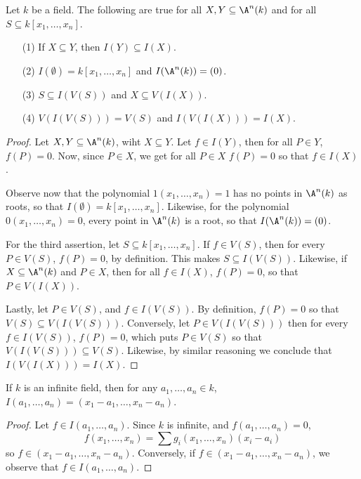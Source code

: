 \begin{lemma}\label{1.3.2}
    Let $k$ be a field. The following are true for all $X,Y \subseteq \A^n(k)$
    and for all $S \subseteq k[x_1, \dots, x_n]$.
    \begin{enumerate}
        \item[(1)] If $X \subseteq Y$, then $I(Y) \subseteq I(X)$.

        \item[(2)] $I(\emptyset)=k[x_1, \dots, x_n]$ and $I(\A^n(k))=(0)$.

        \item[(3)] $S \subseteq I(V(S))$ and $X \subseteq V(I(X))$.

        \item[(4)] $V(I(V(S)))=V(S)$ and $I(V(I(X)))=I(X)$.
    \end{enumerate}
\end{lemma}
\begin{proof}
    Let $X,Y \subseteq \A^n(k)$, wiht $X \subseteq Y$. Let $f \in I(Y)$, then
    for all $P \in Y$, $f(P)=0$. Now, since $P \in X$, we get for all $P \in X$
    $f(P)=0$ so that $f \in I(X)$.

    Observe now that the polynomial $1(x_1, \dots, x_n)=1$ has no points in
    $\A^n(k)$ as roots, so that $I(\emptyset)=k[x_1, \dots, x_n]$. Likewise, for
    the polynomial $0(x_1, \dots, x_n)=0$, every point in $\A^n(k)$ is a root,
    so that $I(\A^n(k))=(0)$.

    For the third assertion, let $S \subseteq k[x_1, \dots, x_n]$. If $f \in V(S)$,
    then for every  $P \in V(S)$, $f(P)=0$, by definition. This makes $S
    \subseteq I(V(S))$. Likewise, if $X \subseteq \A^n(k)$ and $P \in X$, then
    for all $f \in I(X)$, $f(P)=0$, so that $P \in V(I(X))$.

    Lastly, let $P \in V(S)$, and $f \in I(V(S))$. By definition, $f(P)=0$ so
    that $V(S) \subseteq V(I(V(S)))$. Conversely, let $P \in V(I(V(S)))$ then
    for every $f \in I(V(S))$, $f(P)=0$, which puts $P \in V(S)$ so that
    $V(I(V(S))) \subseteq V(S)$. Likewise, by similar reasoning we conclude that
    $I(V(I(X)))=I(X)$.
\end{proof}
\begin{corollary}
    If $k$ is an infinite field, then for any  $a_1, \dots, a_n \in k$, $I(a_1,
    \dots, a_n)=(x_1-a_1, \dots, x_n-a_n)$.
\end{corollary}
\begin{proof}
    Let $f \in I(a_1, \dots, a_n)$. Since $k$ is infinite, and  $f(a_1, \dots,
    a_n)=0$,
    \begin{equation*}
        f(x_1, \dots, x_n)=\sum{g_i(x_1, \dots, x_n)(x_i-a_i)}
    \end{equation*}
    so $f \in (x_1-a_1, \dots, x_n-a_n)$. Conversely, if $f \in (x_1-a_1, \dots,
    x_n-a_n)$, we observe that $f \in I(a_1, \dots, a_n)$.
\end{proof}

